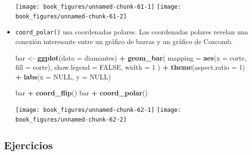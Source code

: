 \documentclass[11pt,oneside]{report}
\newenvironment{Shaded}{\begin{snugshade}}{\end{snugshade}}
\newcommand{\DataTypeTok}[1]{\textcolor[rgb]{0.13,0.29,0.53}{#1}}
\newcommand{\DecValTok}[1]{\textcolor[rgb]{0.00,0.00,0.81}{#1}}
\newcommand{\KeywordTok}[1]{\textcolor[rgb]{0.13,0.29,0.53}{\textbf{#1}}}
\newcommand{\NormalTok}[1]{#1}
\newcommand{\OperatorTok}[1]{\textcolor[rgb]{0.81,0.36,0.00}{\textbf{#1}}}
\newcommand{\OtherTok}[1]{\textcolor[rgb]{0.56,0.35,0.01}{#1}}
\newcommand{\StringTok}[1]{\textcolor[rgb]{0.31,0.60,0.02}{#1}}
\begin{document}
\begin{itemize}
  \texttt{[image: book\_figures/unnamed-chunk-61-1]}
  \texttt{[image: book\_figures/unnamed-chunk-61-2]}
\item
  \texttt{coord\_polar()} usa coordenadas polares. Las coordenadas
  polares revelan una conexión interesante entre un gráfico de barras y
  un gráfico de Coxcomb.

\begin{Shaded}
\begin{Highlighting}[]
\NormalTok{bar <-}\StringTok{ }\KeywordTok{ggplot}\NormalTok{(}\DataTypeTok{data =}\NormalTok{ diamantes) }\OperatorTok{+}
\StringTok{  }\KeywordTok{geom_bar}\NormalTok{(}
    \DataTypeTok{mapping =} \KeywordTok{aes}\NormalTok{(}\DataTypeTok{x =}\NormalTok{ corte, }\DataTypeTok{fill =}\NormalTok{ corte),}
    \DataTypeTok{show.legend =} \OtherTok{FALSE}\NormalTok{,}
    \DataTypeTok{width =} \DecValTok{1}
\NormalTok{  ) }\OperatorTok{+}
\StringTok{  }\KeywordTok{theme}\NormalTok{(}\DataTypeTok{aspect.ratio =} \DecValTok{1}\NormalTok{) }\OperatorTok{+}
\StringTok{  }\KeywordTok{labs}\NormalTok{(}\DataTypeTok{x =} \OtherTok{NULL}\NormalTok{, }\DataTypeTok{y =} \OtherTok{NULL}\NormalTok{)}

\NormalTok{bar }\OperatorTok{+}\StringTok{ }\KeywordTok{coord_flip}\NormalTok{()}
\NormalTok{bar }\OperatorTok{+}\StringTok{ }\KeywordTok{coord_polar}\NormalTok{()}
\end{Highlighting}
\end{Shaded}

  \texttt{[image: book\_figures/unnamed-chunk-62-1]}
  \texttt{[image: book\_figures/unnamed-chunk-62-2]}
\end{itemize}

\hypertarget{ejercicios-6}{%
\subsection{Ejercicios}\label{ejercicios-6}}
\end{document}
